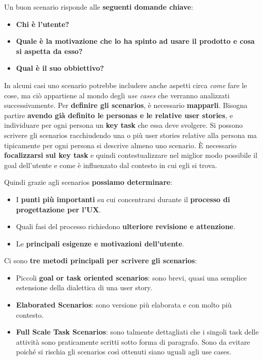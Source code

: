 Un buon scenario risponde alle \textbf{seguenti domande chiave}:

\begin{itemize}
	\item \textbf{Chi è l'utente?}
	\item \textbf{Quale è la motivazione che lo ha spinto ad usare il prodotto e cosa si aspetta da esso?}
	\item \textbf{Qual è il suo obbiettivo?}
\end{itemize}

In alcuni casi uno scenario potrebbe includere anche aspetti circa \textit{come} fare le cose, ma ciò appartiene al mondo degli \textit{use cases} che verranno analizzati successivamente.
Per \textbf{definire gli scenarios}, è necessario \textbf{mapparli}. Bisogna partire \textbf{avendo già definito le personas e le relative user stories}, e individuare per ogni persona un \textbf{key task} che essa deve svolgere. Si possono scrivere gli scenarios racchiudendo una o più
user stories relative alla persona ma tipicamente per ogni persona si descrive  almeno uno scenario. È necessario \textbf{focalizzarsi sul key task} e quindi contestualizzare nel miglior modo possibile il goal dell'utente e come è influenzato dal contesto in cui egli si trova.

Quindi grazie agli scenarios \textbf{possiamo determinare}:

\begin{itemize}
	\item I \textbf{punti più importanti} su cui concentrarsi durante il \textbf{processo di progettazione per l'UX}.
	\item Quali fasi del processo richiedono \textbf{ulteriore revisione e attenzione}.
	\item Le \textbf{principali esigenze e motivazioni dell'utente}.
\end{itemize}

\pagebreak

Ci sono \textbf{tre metodi principali per scrivere gli scenarios}:

\begin{itemize}
	\item Piccoli \textbf{goal or task oriented scenarios}: sono brevi, quasi una semplice estensione della dialettica di una user story.
	\item \textbf{Elaborated Scenarios}: sono versione più elaborata e con molto più contesto.
	\item \textbf{Full Scale Task Scenarios}: sono talmente dettagliati che i singoli task delle attività sono praticamente scritti sotto forma di paragrafo. Sono da evitare poiché si rischia gli scenarios così ottenuti siano uguali agli use cases.
\end{itemize}

